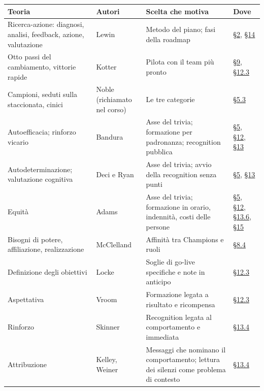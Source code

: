 \documentclass[11pt,a4paper]{article}
\begin{document}
{\small\renewcommand{\arraystretch}{1.25}
\begin{xltabular}{\linewidth}{@{}>{\raggedright\arraybackslash{}\hsize\hspace{0pt}}X>{\raggedright\arraybackslash{}\hsize\hspace{0pt}}X>{\raggedright\arraybackslash{}\hsize\hspace{0pt}}X>{\raggedright\arraybackslash{}\hsize\hspace{0pt}}X@{}}
\toprule
\textbf{Teoria} & \textbf{Autori} & \textbf{Scelta che motiva} & \textbf{Dove} \\
\midrule
\endhead
Ricerca-azione: diagnosi, analisi, feedback, azione, valutazione & Lewin & Metodo del piano; fasi della roadmap & \hyperref[sec:2]{\S2}, \hyperref[sec:14]{\S14} \\
Otto passi del cambiamento, vittorie rapide & Kotter & Pilota con il team più pronto & \hyperref[sec:9]{\S9}, \hyperref[sec:12.3]{\S12.3} \\
Campioni, seduti sulla staccionata, cinici & Noble (richiamato nel corso) & Le tre categorie & \hyperref[sec:5.3]{\S5.3} \\
Autoefficacia; rinforzo vicario & Bandura & Asse del trivia; formazione per padronanza; recognition pubblica & \hyperref[sec:5]{\S5}, \hyperref[sec:12]{\S12}, \hyperref[sec:13]{\S13} \\
Autodeterminazione; valutazione cognitiva & Deci e Ryan & Asse del trivia; avvio della recognition senza punti & \hyperref[sec:5]{\S5}, \hyperref[sec:13]{\S13} \\
Equità & Adams & Asse del trivia; formazione in orario, indennità, costi delle persone & \hyperref[sec:5]{\S5}, \hyperref[sec:12]{\S12}, \hyperref[sec:13.6]{\S13.6}, \hyperref[sec:15]{\S15} \\
Bisogni di potere, affiliazione, realizzazione & McClelland & Affinità tra Champions e ruoli & \hyperref[sec:8.4]{\S8.4} \\
Definizione degli obiettivi & Locke & Soglie di go-live specifiche e note in anticipo & \hyperref[sec:12.3]{\S12.3} \\
Aspettativa & Vroom & Formazione legata a risultato e ricompensa & \hyperref[sec:12.3]{\S12.3} \\
Rinforzo & Skinner & Recognition legata al comportamento e immediata & \hyperref[sec:13.4]{\S13.4} \\
Attribuzione & Kelley, Weiner & Messaggi che nominano il comportamento; lettura dei silenzi come problema di contesto & \hyperref[sec:13.4]{\S13.4} \\

\end{xltabular}}
\end{document}
